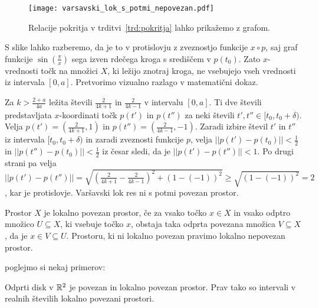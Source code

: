 \documentclass[../TG_magistrsko_delo_sections.tex]{subfiles}
\begin{document}
\begin{figure}[h]
  \centering
  \texttt{[image: varsavski\_lok\_s\_potmi\_nepovezan.pdf]}
  \caption[Primer vektorske slike.]{Relacije pokritja v trditvi~\ref{trd:pokritja} lahko prikažemo z grafom.}
  \label{fig:varsavski_lok}
\end{figure}

S slike lahko razberemo, da je to v protislovju z zveznostjo funkcije $x \circ p$, saj graf funkcije $\sin\left(\frac{\pi}{x}\right)$ sega izven rdečega kroga s središčem v $p(t_0)$. Zato $x$-vrednosti točk na množici $X$, ki ležijo znotraj kroga, ne vsebujejo vseh vrednosti iz intervala $[0, a]$. Pretvorimo vizualno razlago v matematični dokaz.

Za $k > \frac{2+a}{4a}$ ležita števili $\frac{2}{4k+1}$ in $\frac{2}{4k-1}$ v intervalu $[0, a]$. Ti dve števili predstavljata $x$-koordinati točk $p(t')$ in $p(t'')$ za neki števili $t', t'' \in [t_0, t_0 + \delta)$. Velja $p(t') = (\frac{2}{4k+1}, 1)$ in $p(t'') = (\frac{2}{4k-1}, -1)$. Zaradi izbire števil $t'$ in $t''$ iz intervala $[t_0, t_0 + \delta)$ in zaradi zveznosti funkcije $p$, velja $||p(t') - p(t_0)||< \frac{1}{2}$ in $||p(t'') - p(t_0)||< \frac{1}{2}$ iz česar sledi, da je $||p(t') - p(t'')||< 1$. Po drugi strani pa velja $||p(t') - p(t'')|| = \sqrt{\left(\frac{2}{4k+1}-\frac{2}{4k-1}\right)^2 + (1-(-1))^2} \geq \sqrt{(1-(-1))^2} = 2$, kar je protislovje. Varšavski lok res ni s potmi povezan prostor.


\begin{definicija}
Prostor $X$ je lokalno povezan prostor, če za vsako točko $x \in X$ in vsako odptro množico $U \subseteq X$, ki vsebuje točko $x$, obstaja taka odprta povezana množica $V \subseteq X$, da je $x \in V \subseteq U$. Prostoru, ki ni lokalno povezan pravimo lokalno nepovezan prostor.
\end{definicija}

poglejmo si nekaj primerov:
\begin{primer}
Odprti disk v $\mathbb R^2$ je povezan in lokalno povezan prostor. Prav tako so intervali v realnih številih lokalno povezani prostori.
\end{primer}
\end{document}

